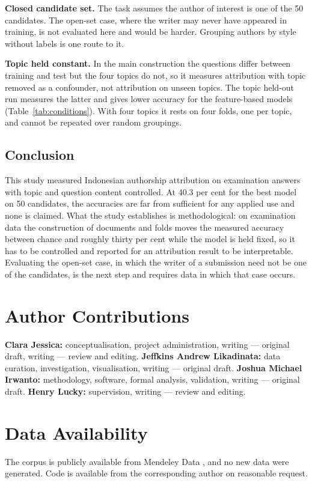 \documentclass[conference]{IEEEtran}
\begin{document}
\textbf{Closed candidate set.} The task assumes the author of interest is one of the 50 candidates. The open-set case, where the writer may never have appeared in training, is not evaluated here and would be harder. Grouping authors by style without labels \cite{Bertocco2023} is one route to it.

\textbf{Topic held constant.} In the main construction the questions differ between training and test but the four topics do not, so it measures attribution with topic removed as a confounder, not attribution on unseen topics. The topic held-out run measures the latter \cite{Altakrori2021,Barlas2021} and gives lower accuracy for the feature-based models (Table~\ref{tab:conditions}). With four topics it rests on four folds, one per topic, and cannot be repeated over random groupings.

\subsection{Conclusion}

This study measured Indonesian authorship attribution on examination answers with topic and question content controlled. At 40.3 per cent for the best model on 50 candidates, the accuracies are far from sufficient for any applied use and none is claimed. What the study establishes is methodological: on examination data the construction of documents and folds moves the measured accuracy between chance and roughly thirty per cent while the model is held fixed, so it has to be controlled and reported for an attribution result to be interpretable. Evaluating the open-set case, in which the writer of a submission need not be one of the candidates, is the next step and requires data in which that case occurs.

\section*{Author Contributions}
\textbf{Clara Jessica:} conceptualisation, project administration, writing --- original draft, writing --- review and editing.
\textbf{Jeffkins Andrew Likadinata:} data curation, investigation, visualisation, writing --- original draft.
\textbf{Joshua Michael Irwanto:} methodology, software, formal analysis, validation, writing --- original draft.
\textbf{Henry Lucky:} supervision, writing --- review and editing.

\section*{Data Availability}
The corpus is publicly available from Mendeley Data \cite{Rahutomo2018}, and no new data were generated. Code is available from the corresponding author on reasonable request.
\end{document}
